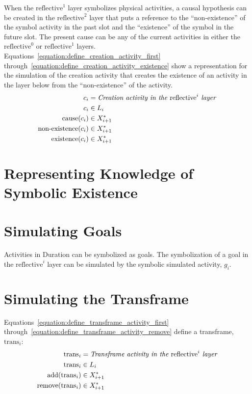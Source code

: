 When the $\text{reflective}^1$ layer symbolizes physical activities, a
causal hypothesis can be created in the $\text{reflective}^2$ layer
that puts a reference to the ``non-existence'' of the symbol activity
in the past slot and the ``existence'' of the symbol in the future
slot.  The present cause can be any of the current activities in
either the $\text{reflective}^0$ or $\text{reflective}^1$ layers.
{\mbox{Equations~\ref{equation:define_creation_activity_first}}}
{\mbox{through~\ref{equation:define_creation_activity_existence}}}
show a representation for the simulation of the creation activity that
creates the existence of an activity in the layer below from the
``non-existence'' of the activity.
\begin{align}
\label{equation:define_creation_activity_first}
                      c_i &= \text{\emph{Creation activity in the} reflective}^i\text{\emph{ layer}} \\
                      c_i &\in L_i \\
\label{equation:define_creation_activity_cause}
        \text{cause}(c_i) &\in X_{i+1}^* \\
\label{equation:define_creation_activity_non_existence}
\text{non-existence}(c_i) &\in X_{i+1}^* \\
\label{equation:define_creation_activity_existence}
    \text{existence}(c_i) &\in X_{i+1}^*
\end{align}

\section{Representing Knowledge of Symbolic Existence}


\section{Simulating Goals}

Activities in Duration can be symbolized as goals.  The symbolization
of a goal in the $\text{reflective}^i$ layer can be simulated by the
symbolic simulated activity, $g_i$.

\section{Simulating the Transframe}

Equations~\ref{equation:define_transframe_activity_first}
through~\ref{equation:define_transframe_activity_remove} define a
transframe, $\text{trans}_i$:
\begin{align}
\label{equation:define_transframe_activity_first}
                  \text{trans}_i &= \text{\emph{Transframe activity in the} reflective}^i\text{\emph{ layer}} \\
                  \text{trans}_i &\in L_i \\
\label{equation:define_transframe_activity_add}
   \text{add}(\text{trans}_i) &\in X_{i+1}^* \\
\label{equation:define_transframe_activity_remove}
\text{remove}(\text{trans}_i) &\in X_{i+1}^*
\end{align}


